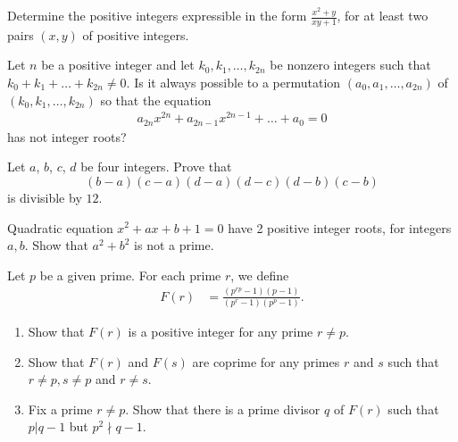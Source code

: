 \documentclass[problems.tex]{subfile}
\begin{document}
	\begin{problem}
		Determine the positive integers expressible in the form $\frac{x^2+y}{xy+1}$, for at least two pairs $(x,y)$ of positive integers. %
	\end{problem}
	
	
	
	
	\begin{problem}
		Let $n$ be a positive integer and let $k_0,k_1, \dots,k_{2n}$ be nonzero integers such that $k_0+k_1 +\dots+k_{2n}\neq 0$. Is it always possible to a permutation $(a_0,a_1,\dots,a_{2n})$ of $(k_0,k_1,\dots,k_{2n})$ so that the equation
		\begin{align*} a_{2n}x^{2n}+a_{2n-1}x^{2n-1}+\dots+a_0=0 \end{align*}has not integer roots? %
	\end{problem}
	
	
	\begin{problem}
		Let $a$, $b$, $c$, $d$ be four integers. Prove that $$\left(b-a\right)\left(c-a\right)\left(d-a\right)\left(d-c\right)\left(d-b\right)\left(c-b\right)$$is divisible by $12$. %
	\end{problem}
	
	
	
	\begin{problem}
		Quadratic equation $ x^2+ax+b+1=0$ have 2 positive integer roots, for integers $ a,b$. Show that $ a^2+b^2$ is not a prime. %
	\end{problem}
	
	
	
	\begin{problem}
		Let $p$ be a given prime. For each prime $r$, we define
		\begin{align*}
			F(r) &= \frac{(p^{rp} -1)(p-1)}{(p^r-1)(p^p-1)}.
		\end{align*}
		\begin{enumerate}
			\item Show that $F(r)$ is a positive integer for any prime $r \neq p$.
			\item Show that $F(r)$ and $F(s)$ are coprime for any primes $r$ and $s$ such that $r \neq p, s\neq p$ and $r \neq s$.
			\item Fix a prime $r \neq p$. Show that there is a prime divisor $q$ of $F(r)$ such that $p |q - 1$ but $p^2 \nmid q - 1$.
		\end{enumerate}
	\end{problem}
	
\end{document}
